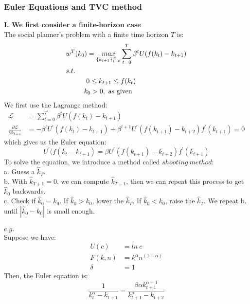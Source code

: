 \documentclass{article}
\begin{document}
\subsubsection{Euler Equations and TVC method}
\textbf{I. We first consider a finite-horizon case}\\
The social planner's problem with a finite time horizon $T$ is:
\begin{align*}
	&w^T(k_0) = \mathop{max}\limits_{\{k_{t+1}\}^T_{t=0}} \sum\limits^T_{t=0} \beta^t U(f(k_t) - k_{t+1})\\
	&s.t.\\
	&\indent\indent 0 \leq k_{t+1} \leq f(k_t)\\
	&\indent\ \ \ \, k_0 > 0,\ \text{as given}
\end{align*}
We first use the Lagrange method:
\begin{align*}
	\mathscr{L} &= \sum\limits^T_{t=0} \beta^t U(f(k_t) - k_{t+1})\\
	\frac{\partial \mathscr{L}}{\partial k_{t+1}} &= -\beta^t U^\prime(f(k_t) - k_{t+1}) + \beta^{t+1} U^\prime(f(k_{t+1}) - k_{t+2}) f^\prime(k_{t+1}) = 0	
\end{align*} 
which gives us the Euler equation:
\begin{equation*}
	U^\prime(f(k_{t} - k_{t+1}) = \beta U^\prime(f(k_{t+1}) - k_{t+2}) f^\prime(k_{t+1})
\end{equation*}
To solve the equation, we introduce a method called $shooting\ method$:\\
\indent a. Guess a $\hat{k}_T$.\\
\indent b. With $\hat{k}_{T+1} = 0$, we can compute $\hat{k}_{T-1}$, then we can repeat this process to get $\hat{k}_0$ backwards.\\
\indent c. Check if $\hat{k}_0 = k_0$. If $\hat{k}_0 > k_0$, lower the $\hat{k}_T$. If $\hat{k}_0 < k_0$, raise the $\hat{k}_T$. We repeat b. until $|\hat{k}_0 - k_0|$ is small enough.\\\\
$e.g.$\\
Suppose we have:
\begin{align*}
	U(c) &= ln\ c\\
	F(k, n) &= k^\alpha n^{(1-\alpha)}\\
	\delta &= 1
\end{align*}
Then, the Euler equation is:
\begin{equation}
	\frac{1}{k^\alpha_t - k_{t+1}} = \frac{\beta \alpha k^{\alpha-1}_{t+1}}{k^\alpha_{t+1} - k_{t+2}} \label{eq: 3210}
\end{equation}
\end{document}
